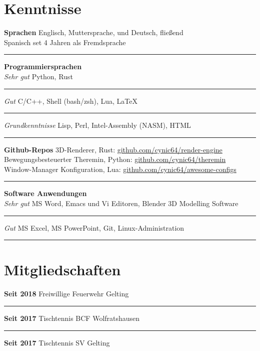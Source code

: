 \documentclass[12pt]{article}
\newcommand{\link}[1]{{\color{blue}\underline{#1}}}
\newcommand{\sect}[1]{
  {
    \vspace{12pt}
    \section*{
      \fontsize{18}{0}\selectfont
      \hspace{-12pt}
      \vspace{-12pt}
      #1
    }
    \vspace{-6pt}
  }
}
\newcommand{\sep}{{\color{gray}\vspace{-12pt}\hrule}}
\begin{document}
\pagebreak

\sect{Kenntnisse}
\textbf{Sprachen} \hfill{Englisch, Muttersprache, und Deutsch, flie{\ss}end} \\
\hspace*{\fill}Spanisch set 4 Jahren als Fremdsprache \\
\sep
\vspace{12pt}

\textbf{Programmiersprachen} \\
\textit{Sehr gut} \hfill{Python, Rust} \\
\sep
\textit{Gut} \hfill{C/C++, Shell (bash/zsh), Lua, \LaTeX} \\
\sep
\textit{Grundkenntnisse} \hfill{Lisp, Perl, Intel-Assembly (NASM), HTML} \\
\sep
\vspace{12pt}

{
  \small
  \textbf{Github-Repos} \hfill{3D-Renderer, Rust: \link{github.com/cynic64/render-engine}} \\
  \hspace*{\fill} Bewegungsbesteuerter Theremin, Python: \link{github.com/cynic64/theremin} \\
  \hspace*{\fill} Window-Manager Konfiguration, Lua:
  \link{github.com/cynic64/awesome-configs} \\
}
\sep
\vspace{12pt}

\textbf{Software Anwendungen} \\
\textit{Sehr gut} \hfill{MS Word, Emacs und Vi Editoren, Blender 3D Modelling Software} \\
\sep
\textit{Gut} \hfill{MS Excel, MS PowerPoint, Git, Linux-Administration} \\
\sep
\vspace{12pt}

\sect{Mitgliedschaften}

\textbf{Seit 2018} \hfill{Freiwillige Feuerwehr Gelting} \\
\sep
\textbf{Seit 2017} \hfill{Tischtennis BCF Wolfratshausen} \\
\sep
\textbf{Seit 2017} \hfill{Tischtennis SV Gelting}
\end{document}
